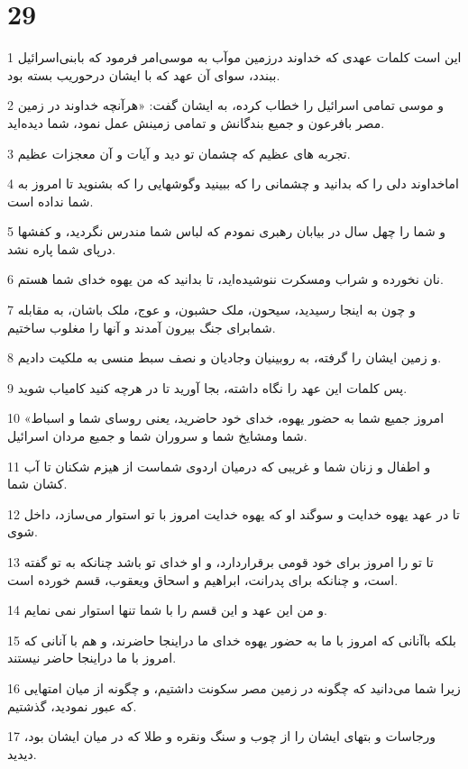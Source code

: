 \chapter{29}

\par 1 این است کلمات عهدی که خداوند درزمین موآب به موسی‌امر فرمود که بابنی‌اسرائیل ببندد، سوای آن عهد که با ایشان درحوریب بسته بود.
\par 2 و موسی تمامی اسرائیل را خطاب کرده، به ایشان گفت: «هر‌آنچه خداوند در زمین مصر بافرعون و جمیع بندگانش و تمامی زمینش عمل نمود، شما دیده‌اید.
\par 3 تجربه های عظیم که چشمان تو دید و آیات و آن معجزات عظیم.
\par 4 اماخداوند دلی را که بدانید و چشمانی را که ببینید وگوشهایی را که بشنوید تا امروز به شما نداده است.
\par 5 و شما را چهل سال در بیابان رهبری نمودم که لباس شما مندرس نگردید، و کفشها درپای شما پاره نشد.
\par 6 نان نخورده و شراب ومسکرت ننوشیده‌اید، تا بدانید که من یهوه خدای شما هستم.
\par 7 و چون به اینجا رسیدید، سیحون، ملک حشبون، و عوج، ملک باشان، به مقابله شمابرای جنگ بیرون آمدند و آنها را مغلوب ساختیم.
\par 8 و زمین ایشان را گرفته، به روبینیان وجادیان و نصف سبط منسی به ملکیت دادیم.
\par 9 پس کلمات این عهد را نگاه داشته، بجا آورید تا در هر‌چه کنید کامیاب شوید.
\par 10 «امروز جمیع شما به حضور یهوه، خدای خود حاضرید، یعنی روسای شما و اسباط شما ومشایخ شما و سروران شما و جمیع مردان اسرائیل.
\par 11 و اطفال و زنان شما و غریبی که درمیان اردوی شماست از هیزم شکنان تا آب کشان شما.
\par 12 تا در عهد یهوه خدایت و سوگند او که یهوه خدایت امروز با تو استوار می‌سازد، داخل شوی.
\par 13 تا تو را امروز برای خود قومی برقراردارد، و او خدای تو باشد چنانکه به تو گفته است، و چنانکه برای پدرانت، ابراهیم و اسحاق ویعقوب، قسم خورده است.
\par 14 و من این عهد و این قسم را با شما تنها استوار نمی نمایم.
\par 15 بلکه باآنانی که امروز با ما به حضور یهوه خدای ما دراینجا حاضرند، و هم با آنانی که امروز با ما دراینجا حاضر نیستند.
\par 16 زیرا شما می‌دانید که چگونه در زمین مصر سکونت داشتیم، و چگونه از میان امتهایی که عبور نمودید، گذشتیم.
\par 17 ورجاسات و بتهای ایشان را از چوب و سنگ ونقره و طلا که در میان ایشان بود، دیدید.
